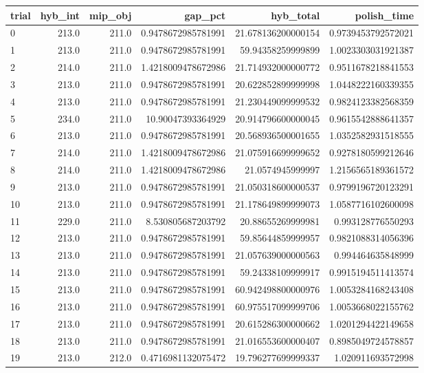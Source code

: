 \begin{tabular}{lrrrrr}
\hline
trial & hyb_int & mip_obj & gap_pct & hyb_total & polish_time \\ \hline
0 & 213.0 & 211.0 & 0.9478672985781991 & 21.678136200000154 & 0.9739453792572021 \\
1 & 213.0 & 211.0 & 0.9478672985781991 & 59.94358259999899 & 1.0023303031921387 \\
2 & 214.0 & 211.0 & 1.4218009478672986 & 21.714932000000772 & 0.9511678218841553 \\
3 & 213.0 & 211.0 & 0.9478672985781991 & 20.622852899999998 & 1.0448222160339355 \\
4 & 213.0 & 211.0 & 0.9478672985781991 & 21.230449099999532 & 0.9824123382568359 \\
5 & 234.0 & 211.0 & 10.90047393364929 & 20.914796600000045 & 0.9615542888641357 \\
6 & 213.0 & 211.0 & 0.9478672985781991 & 20.568936500001655 & 1.0352582931518555 \\
7 & 214.0 & 211.0 & 1.4218009478672986 & 21.075916699999652 & 0.9278180599212646 \\
8 & 214.0 & 211.0 & 1.4218009478672986 & 21.0574945999997 & 1.2156565189361572 \\
9 & 213.0 & 211.0 & 0.9478672985781991 & 21.050318600000537 & 0.9799196720123291 \\
10 & 213.0 & 211.0 & 0.9478672985781991 & 21.178649899999073 & 1.0587716102600098 \\
11 & 229.0 & 211.0 & 8.530805687203792 & 20.88655269999981 & 0.993128776550293 \\
12 & 213.0 & 211.0 & 0.9478672985781991 & 59.85644859999957 & 0.9821088314056396 \\
13 & 213.0 & 211.0 & 0.9478672985781991 & 21.057639000000563 & 0.994464635848999 \\
14 & 213.0 & 211.0 & 0.9478672985781991 & 59.24338109999917 & 0.9915194511413574 \\
15 & 213.0 & 211.0 & 0.9478672985781991 & 60.942498800000976 & 1.0053284168243408 \\
16 & 213.0 & 211.0 & 0.9478672985781991 & 60.975517099999706 & 1.0053668022155762 \\
17 & 213.0 & 211.0 & 0.9478672985781991 & 20.615286300000662 & 1.0201294422149658 \\
18 & 213.0 & 211.0 & 0.9478672985781991 & 21.016553600000407 & 0.8985049724578857 \\
19 & 213.0 & 212.0 & 0.4716981132075472 & 19.796277699999337 & 1.020911693572998 \\
\hline
\end{tabular}
